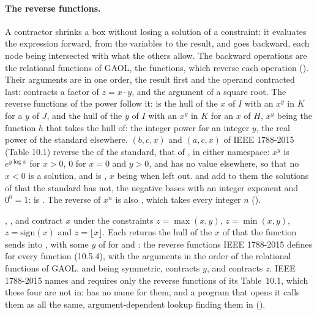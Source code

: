 \paragraph{The reverse functions.}
A contractor shrinks a box without losing a solution of a constraint: it
evaluates the expression forward, from the variables to the result, and goes
backward, each node being intersected with what the others allow. The
backward operations are the relational functions of GAOL, the 
functions, which reverse each operation ().
Their arguments are in one order, the result first and the operand contracted
last:  contracts a factor of $z=x\cdot y$, and
 the argument of a square root. The reverse functions of
the power follow it:  is the hull of the $x$ of $I$
with an $x^y$ in $K$ for a $y$ of $J$, and 
the hull of the $y$ of $I$ with an $x^y$ in $K$ for an $x$ of $H$, $x^y$ being
the function $h$ that  takes the hull of: the integer power for
an integer $y$, the real power of the standard elsewhere.\newinvfive{}
$(b,c,x)$ and $(a,c,x)$ of IEEE 1788-2015 (Table
10.1) reverse the  of the standard, that of
, in either namespace: $x^y$ is $e^{y\log x}$ for
$x>0$, $0$ for $x=0$ and $y>0$, and has no value elsewhere, so that no $x<0$ is a
solution, and  is , $x$ being
\itv{-\infty}{+\infty} when left out.  and
 add to them the solutions of  that
the standard has not, the negative bases with an integer exponent and
$0^0=1$:  is . The reverse of
$x^n$ is also , which takes every integer $n$
().

\medskip
{}, ,  and
 contract $x$ under the constraints $z=\max(x,y)$,
$z=\min(x,y)$, $z=\mathrm{sign}(x)$ and $z=\lfloor x\rfloor$.\newinvfive{}
Each returns the hull of the $x$ of  that the function sends into
, with some $y$ of  for  and : the reverse
functions IEEE 1788-2015 defines for every function (10.5.4), with the
arguments in the order of the relational functions of GAOL.  and
 being symmetric,  contracts $y$, and
 contracts $z$. IEEE 1788-2015 names and requires only
the reverse functions of its Table~10.1, which these four are not in:
 has no name for them, and a program that opens it calls
them as  all the same, argument-dependent lookup
finding them in  ().


